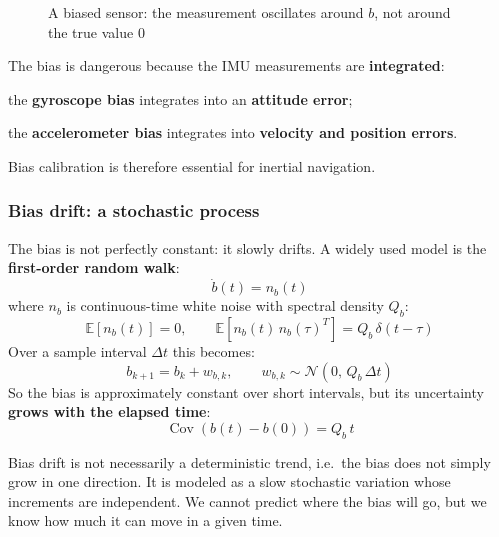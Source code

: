 \begin{figure}[H]
    \centering
    \caption{A biased sensor: the measurement oscillates around $b$, not around the true value $0$}
\end{figure}

The bias is dangerous because the IMU measurements are \textbf{integrated}:
\begin{compactitemize}
    \item the \textbf{gyroscope bias} integrates into an \textbf{attitude error};
    \item the \textbf{accelerometer bias} integrates into \textbf{velocity and position errors}.
\end{compactitemize}
Bias calibration is therefore essential for inertial navigation.

\subsubsection{Bias drift: a stochastic process}
The bias is not perfectly constant: it slowly drifts. A widely used model is the \textbf{first-order random walk}:
\[
\dot b(t) = n_b(t)
\]
where $n_b$ is continuous-time white noise with spectral density $Q_b$:
\[
\mathbb{E}[n_b(t)] = 0, \qquad \mathbb{E}\!\left[n_b(t)\, n_b(\tau)^T\right] = Q_b\, \delta(t-\tau)
\]
Over a sample interval $\Delta t$ this becomes:
\[
b_{k+1} = b_k + w_{b,k}, \qquad w_{b,k} \sim \mathcal{N}(0,\, Q_b\, \Delta t)
\]
So the bias is approximately constant over short intervals, but its uncertainty \textbf{grows with the elapsed time}:
\[
\operatorname{Cov}\!\left(b(t) - b(0)\right) = Q_b\, t
\]

\begin{infobox}[Interpretation]
Bias drift is not necessarily a deterministic trend, i.e.\ the bias does not simply grow in one direction. It is modeled as a slow stochastic variation whose increments are independent. We cannot predict where the bias will go, but we know how much it can move in a given time.
\end{infobox}

